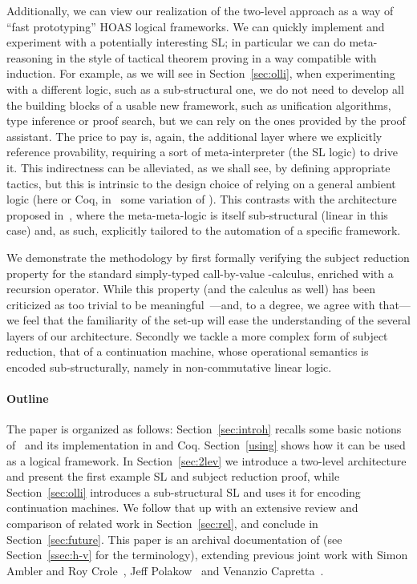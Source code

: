\documentclass[final]{svjour3}
\begin{document}
Additionally, we can view our realization of the two-level approach as
a way of ``fast prototyping'' HOAS logical frameworks. We can quickly
implement and experiment with a potentially interesting SL; in
particular we can do meta-reasoning in the style of tactical theorem
proving in a way compatible with induction. For example, as we will
see in Section~\ref{sec:olli}, when experimenting with a different
logic, such as a sub-structural one, we do not need to develop all the
building blocks of a usable new framework, such as unification
algorithms, type inference or proof search, but we can rely on the ones
provided by the proof assistant.  The price to pay is, again, the
additional layer where we explicitly reference provability, requiring
a sort of meta-interpreter (the SL logic) to drive it.  This
indirectness can be alleviated, as we shall see, by defining
appropriate tactics, but this is intrinsic to the design choice of
relying on a general ambient logic (here \HOL or Coq,
in~\cite{McDowell01,Tiu04phd} some variation of ). This
contrasts with the architecture proposed in~\cite{McCreight03}, where
the meta-meta-logic is itself sub-structural (linear in this case)
and, as such, explicitly tailored to the automation of a specific
framework.

We demonstrate the methodology by first formally verifying the
subject reduction property for the standard simply-typed call-by-value
-calculus, enriched with a recursion operator.  While this
property (and the calculus as well) has been criticized as too trivial to
be meaningful~\cite{poplmark2005}---and, to a degree, we  agree
with that---we feel that the familiarity of the set-up will ease the
understanding of the several layers of our architecture. Secondly we
tackle a more complex form of subject reduction, that of a
continuation machine, whose operational semantics is encoded
sub-structurally, namely in non-commutative linear logic.

\paragraph{Outline}

The paper is organized as follows: Section~\ref{sec:introh} recalls some
basic notions of \hybrid\ and its implementation in \HOL and Coq.
Section~\ref{using} shows how it can be used as a logical framework.  In
Section~\ref{sec:2lev} we introduce a two-level architecture and present the
first example SL and subject reduction proof,
while Section~\ref{sec:olli} introduces a sub-structural SL and uses it
for encoding continuation machines. We follow that up with an
extensive review and comparison of related work in Section~\ref{sec:rel},
and conclude in Section~\ref{sec:future}.
This paper is an archival documentation of  (see
Section~\ref{ssec:h-v} for the terminology), extending previous joint
work with Simon Ambler and Roy
Crole~\cite{MomTP01,Ambler02,Momigliano02lfm,ACM03prim,Momigliano03fos},
Jeff Polakow~\cite{MomiglianoP03} and Venanzio
Capretta~\cite{CapFel07}.
\end{document}
